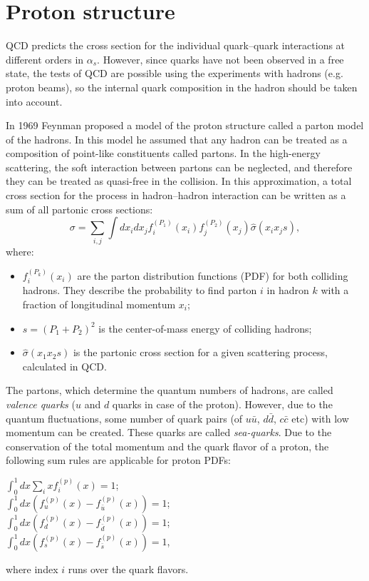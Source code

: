 \section{Proton structure}\label{sec:ProtStr}
QCD predicts the cross section for the individual quark--quark interactions at different orders in $\alpha_s$. However, since quarks have not been observed in a free state, the tests of QCD  are possible using the experiments with hadrons (e.g. proton beams), so the internal quark composition in the hadron should be taken into account. 

In 1969 Feynman proposed a model of the proton structure called a parton model of the hadrons\cite{Feynman1969}. In this model he assumed that any hadron can be treated as a composition of point-like constituents called partons. In the high-energy scattering, the soft interaction between partons can be neglected, and therefore they can be treated as quasi-free in the collision. In this approximation, a total cross section for the process in hadron--hadron interaction can be written as a sum of all partonic cross sections:
\begin{equation}
\sigma = \sum_{i,j} \int dx_i dx_j f_i^{(P_1)}(x_i) f_j^{(P_2)}(x_j) \hat{\sigma}(x_ix_js), 
\end{equation}
where:
\begin{itemize}
\item $f_i^{(P_k)}(x_i)$ are the parton distribution functions (PDF) for both colliding hadrons. They describe the probability to find parton $i$  in hadron $k$ with a fraction of longitudinal momentum $x_i$;
\item $s=(P_1+P_2)^2$ is the center-of-mass energy of colliding hadrons;
\item $\hat{\sigma}(x_1x_2s)$ is the partonic cross section for a given scattering process, calculated in QCD.
\end{itemize}

The partons, which determine the quantum numbers of hadrons, are called \textit{valence quarks} ($u$ and $d$ quarks in case of the proton).  However, due to the quantum fluctuations, some number of quark pairs (of $u\bar{u}$, $d\bar{d}$, $c\bar{c}$ etc) with low momentum can be created. These quarks are called \textit{sea-quarks}. Due to the conservation of the total momentum and the quark flavor of a proton, the following sum rules are applicable for proton PDFs:
\begin{center}
$\int_0^1dx \sum_i x f_i^{(p)}(x) = 1$;\\
$\int_0^1dx (f_u^{(p)}(x)-f_{\bar{u}}^{(p)}(x)) = 1$;\\
$\int_0^1dx (f_d^{(p)}(x)-f_{\bar{d}}^{(p)}(x)) = 1$;\\
$\int_0^1dx (f_s^{(p)}(x)-f_{\bar{s}}^{(p)}(x)) = 1$,
\end{center}
where index $i$ runs over the quark flavors.


